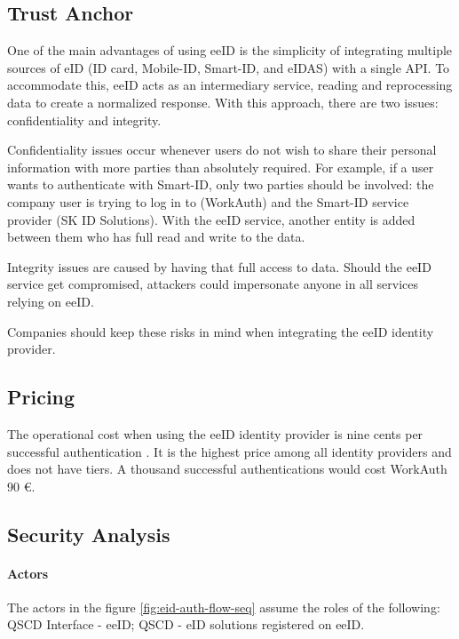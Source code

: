 \subsection{Trust Anchor}

One of the main advantages of using eeID is the simplicity of integrating multiple sources of eID (ID card, Mobile-ID, Smart-ID, and eIDAS) with a single API. To accommodate this, eeID acts as an intermediary service, reading and reprocessing data to create a normalized response. With this approach, there are two issues: confidentiality and integrity.

Confidentiality issues occur whenever users do not wish to share their personal information with more parties than absolutely required. For example, if a user wants to authenticate with Smart-ID, only two parties should be involved: the company user is trying to log in to (WorkAuth) and the Smart-ID service provider (SK ID Solutions). With the eeID service, another entity is added between them who has full read and write to the data.

Integrity issues are caused by having that full access to data. Should the eeID service get compromised, attackers could impersonate anyone in all services relying on eeID.

Companies should keep these risks in mind when integrating the eeID identity provider.

\subsection{Pricing}

The operational cost when using the eeID identity provider is nine cents per successful authentication \cite{eeid-pricing}. It is the highest price among all identity providers and does not have tiers. A thousand successful authentications would cost WorkAuth 90 €.

\subsection{Security Analysis}

\paragraph{Actors}

The actors in the figure \ref{fig:eid-auth-flow-seq} assume the roles of the following: QSCD Interface - eeID; QSCD - eID solutions registered on eeID.

